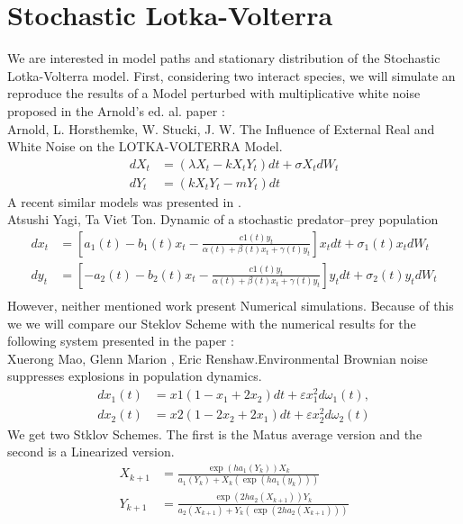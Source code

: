 \documentclass[review]{elsarticle}
\begin{document}
	\section{Stochastic Lotka-Volterra}
		We are interested in model paths and stationary distribution of the Stochastic Lotka-Volterra model.
		First, considering two interact species, we will simulate an reproduce the results of a Model 
		perturbed with multiplicative white noise proposed in the Arnold's  ed. al. paper \cite{Arnold1979}:\\
		Arnold, L. Horsthemke, W. Stucki, J. W. The Influence of External Real and White Noise on the 
		LOTKA-VOLTERRA Model.
		\begin{align*}
			dX_t &= (\lambda X_t - k X_t Y_t ) dt +\sigma X_t dW_t\\
			dY_t &= (k X_t Y_t -mY_t) dt
		\end{align*}
		A recent similar models was presented in \cite{Yagi2011}.\\
		Atsushi Yagi, Ta Viet Ton.
		Dynamic of a stochastic predator–prey population
		\begin{align*}
			dx_t &= 
				\left[
					a_1(t) - b_1(t) x_t
					-\frac{c1(t) y_t}{\alpha(t) + \beta(t) x_t + \gamma(t) y_t  }
				\right] x_t dt
				+\sigma_1(t) x_t dW_t	\\
			dy_t &= 
				\left[
					-a_2(t) - b_2(t) x_t
					-\frac{c1(t) y_t}{\alpha(t) + \beta(t) x_t + \gamma(t) y_t  }
				\right] y_t dt
				+\sigma_2(t) y_t dW_t	\\
		\end{align*}
		However, neither mentioned work present Numerical simulations. Because of this we we will compare
		our Steklov Scheme with the numerical results for the following system presented in the paper
		\cite{Mao2002}:\\
		Xuerong Mao, Glenn Marion , Eric Renshaw.Environmental Brownian noise suppresses explosions in 
		population dynamics.
		\begin{align*}
			dx_1(t) &= 
				x1 (1 - x_1 + 2 x_2 )dt + \varepsilon x_1^2 d\omega_1(t), \\
			dx_2(t) &= 
				x2 (1 - 2 x_2 + 2 x_1 )dt + \varepsilon x_2^2 d\omega_2(t)	
		\end{align*}
		We get two Stklov Schemes. The first is the Matus average version and the second is 
		a Linearized version.
		\begin{align*}
			X_{k+1} &=	\frac{\exp(h a_1(Y_k)) X_k }{ a_1(Y_k) + X_k (\exp(h a_1(y_k)))}	\\
			Y_{k+1} &=	\frac{\exp(2 h a_2(X_{k+1})) Y_k }{ a_2(X_{k+1}) + Y_k( \exp(2h a_2( X_{k+1})))}
		\end{align*}
\end{document}
